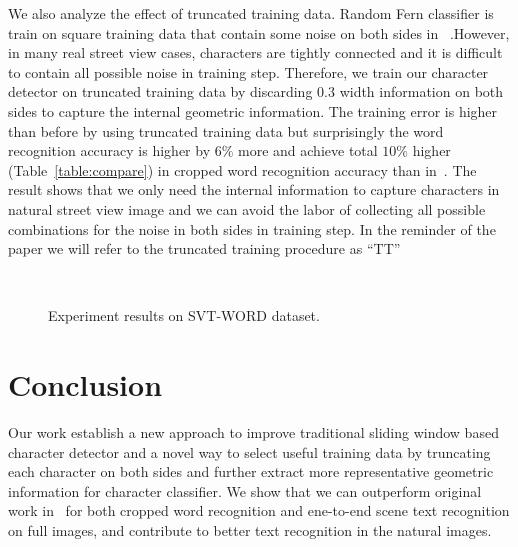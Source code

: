 \documentclass[10pt,twocolumn,letterpaper]{article}
\begin{document}
We also analyze the effect of truncated training data. Random Fern classifier is train on square training data that contain some noise on both sides in~\cite{417} .However, in many real street view cases, characters are tightly connected and it is difficult to contain all possible noise in training step. Therefore, we train our character detector on truncated training data by discarding $0.3$ width information on both sides to capture the internal geometric information. The training error is higher than before by using truncated training data but surprisingly the word recognition accuracy is higher by $6\%$ more and achieve total $10\%$ higher (Table~\ref{table:compare}) in cropped word recognition accuracy than in~\cite{417}. The result shows that we only need the internal information to capture characters in natural street view image and we can avoid the labor of collecting all possible combinations for the noise in both sides in training step. In the reminder of the paper we will refer to the truncated training procedure as ``TT''

\begin{figure}
\begin{center}$
\begin{array}{cc}
\end{array}$
\end{center}
\caption{Experiment results on SVT-WORD dataset.}
\label{figure:result1}
\end{figure}

\section{Conclusion}

Our work establish a new approach to improve traditional sliding window based character detector and a novel way to select useful training data by truncating each character on both sides and further extract more representative geometric information for character classifier. We show that we can outperform original work in~\cite{417} for both cropped word recognition and ene-to-end scene text recognition on full images, and contribute to better text recognition in the natural images.


{\small


}
\end{document}
